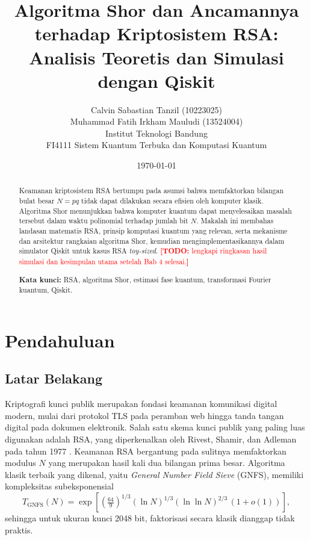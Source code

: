 \documentclass[11pt,a4paper]{article}
\title{\textbf{Algoritma Shor dan Ancamannya terhadap Kriptosistem RSA:\\
Analisis Teoretis dan Simulasi dengan Qiskit}}
\author{Calvin Sabastian Tanzil (10223025)\\
Muhammad Fatih Irkham Mauludi (13524004)\\[2pt]
\small Institut Teknologi Bandung\\
\small FI4111 Sistem Kuantum Terbuka dan Komputasi Kuantum}
\date{\today}
\newcommand{\todo}[1]{\textcolor{red}{\textbf{[TODO:} #1\textbf{]}}}
\begin{document}
\maketitle

\begin{abstract}
Keamanan kriptosistem RSA bertumpu pada asumsi bahwa memfaktorkan bilangan
bulat besar $N = pq$ tidak dapat dilakukan secara efisien oleh komputer klasik.
Algoritma Shor menunjukkan bahwa komputer kuantum dapat menyelesaikan masalah
tersebut dalam waktu polinomial terhadap jumlah bit $N$. Makalah ini membahas
landasan matematis RSA, prinsip komputasi kuantum yang relevan, serta
mekanisme dan arsitektur rangkaian algoritma Shor, kemudian
mengimplementasikannya dalam simulator Qiskit untuk kasus RSA
\emph{toy-sized}. \todo{lengkapi ringkasan hasil simulasi dan kesimpulan utama setelah Bab 4 selesai.}

\medskip
\noindent\textbf{Kata kunci:} RSA, algoritma Shor, estimasi fase kuantum,
transformasi Fourier kuantum, Qiskit.
\end{abstract}

\section{Pendahuluan}

\subsection{Latar Belakang}
Kriptografi kunci publik merupakan fondasi keamanan komunikasi digital modern,
mulai dari protokol TLS pada peramban web hingga tanda tangan digital pada
dokumen elektronik. Salah satu skema kunci publik yang paling luas digunakan
adalah RSA, yang diperkenalkan oleh Rivest, Shamir, dan Adleman pada tahun
1977 \cite{rsa1978}. Keamanan RSA bergantung pada sulitnya memfaktorkan
modulus $N$ yang merupakan hasil kali dua bilangan prima besar. Algoritma
klasik terbaik yang dikenal, yaitu \emph{General Number Field Sieve} (GNFS),
memiliki kompleksitas subeksponensial
\begin{equation}
  T_{\text{GNFS}}(N) = \exp\!\left[\left(\tfrac{64}{9}\right)^{1/3}
  (\ln N)^{1/3} (\ln\ln N)^{2/3}\,(1+o(1))\right],
\end{equation}
sehingga untuk ukuran kunci 2048 bit, faktorisasi secara klasik dianggap tidak
praktis.
\end{document}

